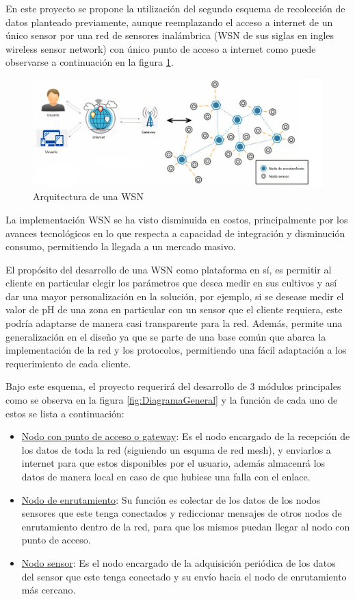 \documentclass[
11pt, %
codirector, %
]{charter}
\begin{document}
En este proyecto se propone la utilización del segundo esquema de recolección de datos planteado previamente, aunque reemplazando el acceso a internet de un único sensor por una red de sensores inalámbrica (WSN de sus siglas en ingles wireless sensor network) con único punto de acceso a internet como puede observarse a continuación en la figura \ref{fig:WSN_architecture}.

\begin{figure}[htpb]
\centering 
\includegraphics[width=.75\textwidth]{./Figuras/WSN_architecture.jpg}
\caption{Arquitectura de una WSN}
\label{fig:WSN_architecture}
\end{figure}

La implementación WSN se ha visto disminuida en costos, principalmente por los avances tecnológicos en lo que respecta a capacidad de integración y disminución consumo, permitiendo la llegada a un mercado masivo.

El propósito del desarrollo de una WSN como plataforma en sí, es permitir al cliente en particular elegir los parámetros que desea medir en sus cultivos y así dar una mayor personalización en la solución, por ejemplo, si se desease medir el valor de pH de una zona en particular con un sensor que el cliente requiera, este podría adaptarse de manera casi transparente para la red. Además, permite una generalización en el diseño ya que se parte de una base común que abarca la implementación de la red y los protocolos, permitiendo una fácil adaptación a los requerimiento de cada cliente.

Bajo este esquema, el proyecto requerirá del desarrollo de 3 módulos principales como se observa en la figura \ref{fig:DiagramaGeneral} y la función de cada uno de estos se lista a continuación:

\begin{itemize}
\item \underline{Nodo con punto de acceso o gateway}: Es el nodo encargado de la recepción de los datos de toda la red (siguiendo un esquma de red mesh), y enviarlos a internet para que estos disponibles por el usuario, además almacenrá los datos de manera local en caso de que hubiese una falla con el enlace.
\item \underline{Nodo de enrutamiento}: Su función es colectar de los datos de los nodos sensores que este tenga conectados y rediccionar mensajes de otros nodos de enrutamiento dentro de la red, para que los mismos puedan llegar al nodo con punto de acceso.
\item \underline{Nodo sensor}: Es el nodo encargado de la adquisición periódica de los datos del sensor que este tenga conectado y su envío hacia el nodo de enrutamiento más cercano.
\end{itemize}
\end{document}
